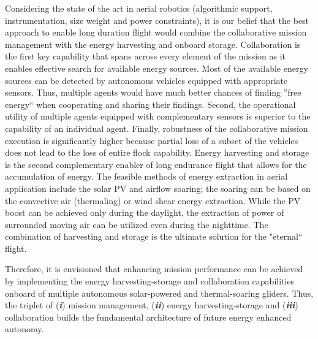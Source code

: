 \documentclass{ifacconf}
\begin{document}

Considering the state of the art in aerial robotics (algorithmic support,
instrumentation, size weight and power constraints), it is our belief that the best
approach to enable long duration flight would combine the collaborative mission
management with the energy harvesting and onboard storage. Collaboration is the first key
capability that spans across every element of the mission as it enables effective search
for available energy sources. Most of the available energy sources can be detected by
autonomous vehicles equipped with appropriate sensors. Thus, multiple agents would have
much better chances of finding ''free energy`` when cooperating and sharing their
findings. Second, the operational utility of multiple agents equipped with complementary
sensors is superior to the capability of an individual agent. Finally, robustness of the
collaborative mission execution is significantly higher because partial loss of a subset
of the vehicles does not lead to the loss of entire flock capability. Energy harvesting
and storage is the second complementary enabler of long endurance flight that allows for
the accumulation of energy. The feasible methods of energy extraction in aerial
application include the solar PV and airflow soaring; the soaring can be based on the
convective air (thermaling) or wind shear energy extraction. While the PV boost can be
achieved only during the daylight, the extraction of power of surrounded moving air can
be utilized even during the nighttime. The combination of harvesting and storage is the
ultimate solution for the "eternal`` flight.

Therefore, it is envisioned that enhancing mission performance can be achieved by
implementing the energy harvesting-storage and collaboration capabilities onboard of
multiple autonomous solar-powered and thermal-soaring gliders. Thus, the triplet of
(\emph{\textbf{i}}) mission management, (\emph{\textbf{ii}}) energy harvesting-storage
and (\emph{\textbf{iii}}) collaboration builds the fundamental architecture of future
energy enhanced autonomy.
\end{document}

